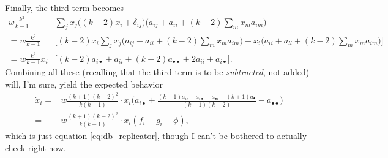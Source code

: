 \documentclass[14pt, a4paper, justified]{article}
\begin{document}
Finally, the third term becomes
\begin{equation}
    \begin{split}
        w \frac{k^2}{k-1} & \sum_j x_j \Big( (k-2)x_i + \delta_{ij} \Big) \Big( a_{ij} + a_{ii} + (k-2) \sum_m x_m a_{im} \Big)
        \\
        = w \frac{k^2}{k-1} & \Big[ (k-2) x_i \sum_j x_j \Big( a_{ij} + a_{ii} + (k-2) \sum_m x_m a_{im} \Big) + x_i \Big( a_{ii} + a_{ll} + (k-2) \sum_m x_m a_{im} \Big) \Big]
        \\
        = w \frac{k^2}{k-1} x_i & \Big[ (k-2) a_{i \bullet} + a_{ii} + (k-2) a_{\bullet \bullet} + 2a_{ii} + a_{i \bullet} \Big].
    \end{split}
\end{equation}
Combining all these (recalling that the third term is to be \emph{subtracted}, not added) will, I'm sure, yield the expected behavior
\begin{equation}
    \begin{split}
        \dot{x}_i = & w \frac{(k+1)(k-2)^2}{k(k-1)} \cdot x_i \Big( a_{i \bullet} + \frac{(k+1)a_{ii} + a_{i \bullet} - a_{\bullet i} - (k+1) a_{\bullet}}{(k+1)(k-2)} - a_{\bullet \bullet} \Big)
        \\
        = & w \frac{(k+1)(k-2)^2}{k(k-1)} \cdot x_i (f_i + g_i - \phi),
    \end{split}
\end{equation}
which is just equation \ref{eq:db_replicator}, though I can't be bothered to actually check right now.
\end{document}
